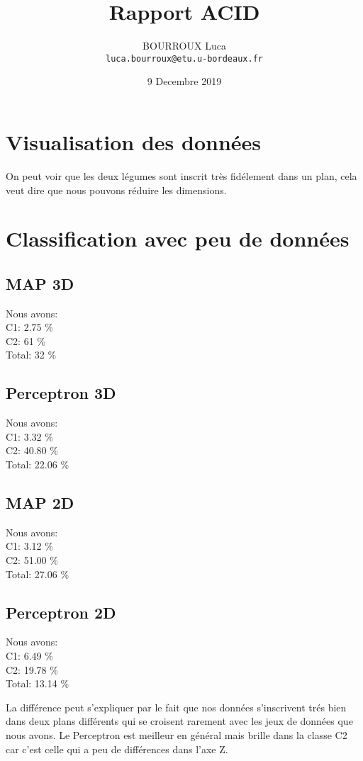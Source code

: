 \documentclass[10pt]{article}
\author{
  BOURROUX Luca\\
  \texttt{luca.bourroux@etu.u-bordeaux.fr}
}
\title{Rapport ACID}
\date{9 Decembre 2019}
\begin{document}
\maketitle

\section{Visualisation des données}
On peut voir que les deux légumes sont inscrit très fidélement dans un plan,
cela veut dire que nous pouvons réduire les dimensions.

\section{Classification avec peu de données}

\subsection{MAP 3D}
Nous avons:\\
C1: 2.75 \% \\
C2: 61 \%\\
Total: 32 \%
\subsection{Perceptron 3D}
Nous avons:\\
C1: 3.32 \% \\
C2: 40.80 \%\\
Total: 22.06 \%

\subsection{MAP 2D}
Nous avons:\\
C1: 3.12 \% \\
C2: 51.00 \%\\
Total: 27.06 \%
\subsection{Perceptron 2D}
Nous avons:\\
C1: 6.49 \% \\
C2: 19.78 \%\\
Total: 13.14 \%


La différence peut s'expliquer par le fait que nos données s'inscrivent trés bien dans deux plans différents
qui se croisent rarement avec les jeux de données que nous avons. Le Perceptron est meilleur
en général mais brille dans la classe C2 car c'est celle qui a peu de différences dans l'axe Z.
\end{document}
